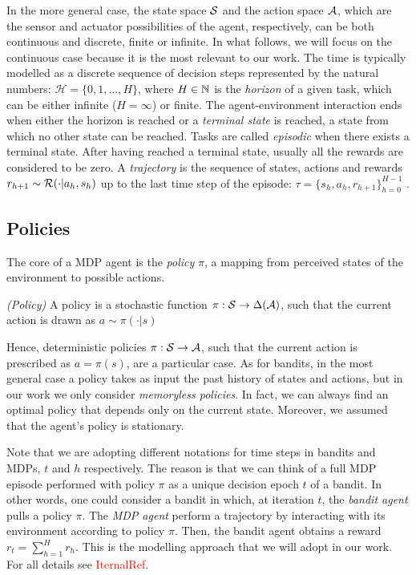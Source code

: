 In the more general case, the state space $\mathcal{S}$ and the action space $\mathcal{A}$, which are the sensor and actuator possibilities of the agent, respectively, can be both continuous and discrete, finite or infinite. In what follows, we will focus on the continuous case because it is the most relevant to our work. The time is typically modelled as a discrete sequence of decision steps represented by the natural numbers: $\mathcal{H} = \{0, 1, \dots, H\}$, where $H\in\mathbb{N}$ is the \emph{horizon} of a given task, which can be either infinite ($H = \infty$) or finite. The agent-environment interaction ends when either the horizon is reached or a \emph{terminal state} is reached, \ie a state from which no other state can be reached. Tasks are called \emph{episodic} when there exists a terminal state. After having reached a terminal state, usually all the rewards are considered to be zero. A \emph{trajectory} is the sequence of states, actions and rewards $r_{h+1}\sim\mathcal{R}(\cdot|a_h, s_h)$ up to the last time step of the episode: $\tau=\{s_h,a_h,r_{h+1}\}_{h=0}^{H-1}$ . \\

\subsection{Policies}
The core of a \gls{MDP} agent is the \emph{policy} $\pi$, a mapping from perceived states of the environment to possible actions. 

\begin{definition} \emph{(Policy)}
A policy is a stochastic function $\pi:\mathcal{S}\to\Delta(\mathcal{A})$, such that the current action is drawn as $a\sim\pi(\cdot|s)$
\end{definition}

Hence, deterministic policies $\pi:\mathcal{S}\to\mathcal{A}$, such that the current action is prescribed as $a=\pi(s)$, are a particular case. As for bandits, in the most general case a policy takes as input the past history of states and actions, but in our work we only consider \emph{memoryless policies}. In fact, we can always find an optimal policy that depends only on the current state. Moreover, we assumed that the agent's policy is stationary.

\begin{remark}
Note that we are adopting different notations for time steps in bandits and \gls{MDP}s, $t$ and $h$ respectively. The reason is that we can think of a full \gls{MDP} episode  performed with policy $\pi$ as a unique decision epoch $t$ of a bandit. In other words, one could consider a bandit in which, at iteration $t$, the \emph{bandit agent} pulls a policy $\pi$. The \emph{\gls{MDP} agent} perform a trajectory by interacting with its environment according to policy $\pi$. Then, the bandit agent obtains a reward $r_t=\sum_{h=1}^{H}r_h$. This is the modelling approach that we will adopt in our work. For all details see \textcolor{red}{IternalRef}.
\end{remark}

